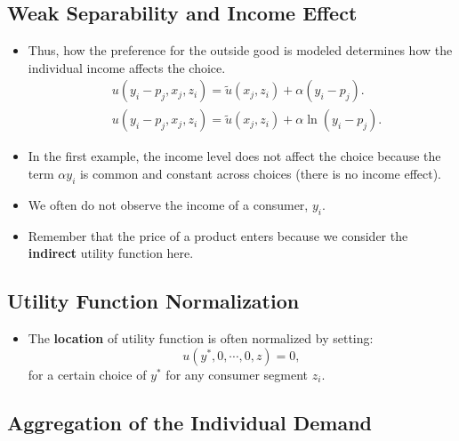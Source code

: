 \documentclass[
]{book}
\providecommand{\tightlist}{%
  \setlength{\itemsep}{0pt}\setlength{\parskip}{0pt}}
\begin{document}
\hypertarget{weak-separability-and-income-effect-1}{%
\subsection{Weak Separability and Income Effect}\label{weak-separability-and-income-effect-1}}

\begin{itemize}
\tightlist
\item
  Thus, how the preference for the outside good is modeled determines how the individual income affects the choice.
  \begin{equation}
  \begin{split}
  &u(y_i - p_j, x_j, z_i) = \tilde{u}(x_j, z_i) + \alpha(y_i - p_j).\\
  &u(y_i - p_j, x_j, z_i) = \tilde{u}(x_j, z_i) + \alpha \ln (y_i - p_j).
  \end{split}
  \end{equation}
\item
  In the first example, the income level does not affect the choice because the term \(\alpha y_i\) is common and constant across choices (there is no income effect).
\item
  We often do not observe the income of a consumer, \(y_i\).
\item
  Remember that the price of a product enters because we consider the \textbf{indirect} utility function here.
\end{itemize}

\hypertarget{utility-function-normalization}{%
\subsection{Utility Function Normalization}\label{utility-function-normalization}}

\begin{itemize}
\tightlist
\item
  The \textbf{location} of utility function is often normalized by setting:
  \begin{equation}
  u(y^*, 0, \cdots, 0, z) = 0,
  \end{equation}
  for a certain choice of \(y^*\) for any consumer segment \(z_i\).
\end{itemize}

\hypertarget{aggregation-of-the-individual-demand}{%
\subsection{Aggregation of the Individual Demand}\label{aggregation-of-the-individual-demand}}
\end{document}
